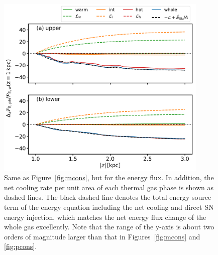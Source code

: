 \documentclass[twocolumn]{aastex62}
\begin{document}
\begin{figure}
	\centering
	\includegraphics[width=0.9\textwidth]{energy_conservation.pdf}
	\caption{Same as Figure~\ref{fig:mcons}, but for the energy flux. In addition, the net cooling rate per unit area of each thermal gas phase is shown as dashed lines. The black dashed line denotes the total energy source term of the energy equation including the net cooling and direct SN energy injection, which matches the net energy flux change of the whole gas excellently. Note that the range of the y-axis is about two orders of magnitude larger than that in Figures~\ref{fig:mcons} and \ref{fig:pcons}.}
	\label{fig:econs}
\end{figure}
\end{document}

